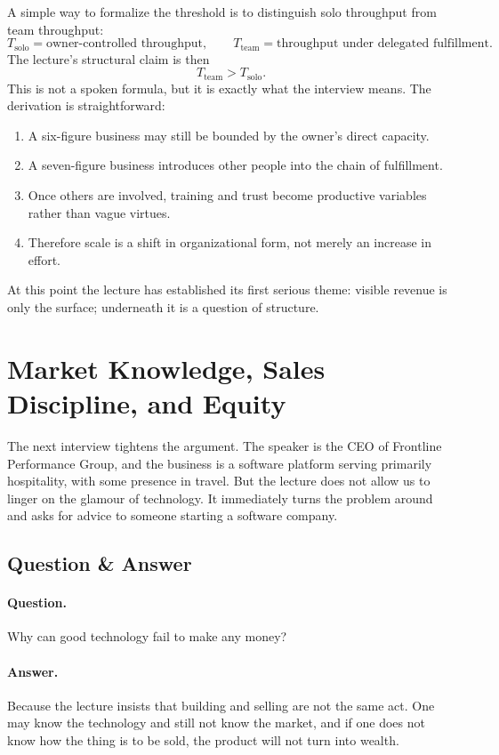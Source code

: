A simple way to formalize the threshold is to distinguish solo throughput from team throughput:
\[
T_{\text{solo}}=\text{owner-controlled throughput}, \qquad
T_{\text{team}}=\text{throughput under delegated fulfillment}.
\]
The lecture's structural claim is then
\begin{equation}
T_{\text{team}} > T_{\text{solo}}.
\end{equation}
This is not a spoken formula, but it is exactly what the interview means. The derivation is straightforward:
\begin{enumerate}
\item A six-figure business may still be bounded by the owner's direct capacity.
\item A seven-figure business introduces other people into the chain of fulfillment.
\item Once others are involved, training and trust become productive variables rather than vague virtues.
\item Therefore scale is a shift in organizational form, not merely an increase in effort.
\end{enumerate}

At this point the lecture has established its first serious theme: visible revenue is only the surface; underneath it is a question of structure.

\section{Market Knowledge, Sales Discipline, and Equity}

The next interview tightens the argument. The speaker is the CEO of Frontline Performance Group, and the business is a software platform serving primarily hospitality, with some presence in travel. But the lecture does not allow us to linger on the glamour of technology. It immediately turns the problem around and asks for advice to someone starting a software company.

\subsection{Question \& Answer}

\paragraph{Question.} Why can good technology fail to make any money?

\paragraph{Answer.} Because the lecture insists that building and selling are not the same act. One may know the technology and still not know the market, and if one does not know how the thing is to be sold, the product will not turn into wealth.

